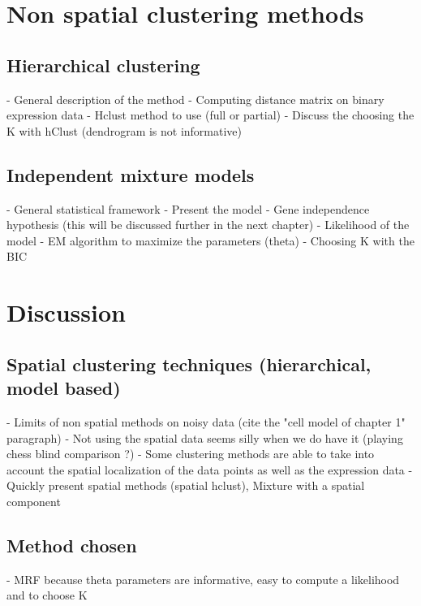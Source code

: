 \section{Non spatial clustering methods}
	\subsection{Hierarchical clustering}
    - General description of the method
    - Computing distance matrix on binary expression data
    - Hclust method to use (full or partial)
    - Discuss the choosing the K with hClust (dendrogram is not informative)
 
	\subsection{Independent mixture models}
    - General statistical framework
    - Present the model
    - Gene independence hypothesis (this will be discussed further in the next chapter)
    - Likelihood of the model
    - EM algorithm to maximize the parameters (theta)
    - Choosing K with the BIC

\section{Discussion}
	\subsection{Spatial clustering techniques (hierarchical, model based)}
    - Limits of non spatial methods on noisy data (cite the "cell model of chapter 1" paragraph)
    - Not using the spatial data seems silly when we do have it (playing chess blind comparison ?)
    - Some clustering methods are able to take into account the spatial localization of the data points as well as the expression data
    - Quickly present spatial methods (spatial hclust), Mixture with a spatial component

	\subsection{Method chosen}
    - MRF because theta parameters are informative, easy to compute a likelihood and to choose K




